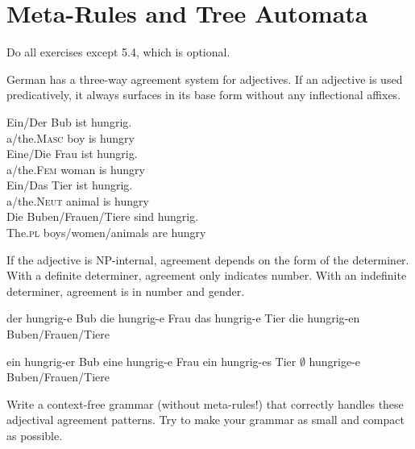 \chapter{Meta-Rules and Tree Automata}
\label{cha:metarules}

Do all exercises except 5.4, which is optional.

\begin{exercise}
    German has a three-way agreement system for adjectives.
    If an adjective is used predicatively, it always surfaces in its base form without any inflectional affixes.
    \begin{exe}
        \ex
        \begin{xlist}
            \ex \gll Ein\slash Der Bub ist hungrig.\\
                     a\slash the.\textsc{Masc} boy is hungry\\
            \ex \gll Eine\slash Die Frau ist hungrig.\\
                     a\slash the.\textsc{Fem} woman is hungry\\
            \ex \gll Ein\slash Das Tier ist hungrig.\\
                     a\slash the.\textsc{Neut} animal is hungry\\
            \ex \gll Die Buben\slash Frauen\slash Tiere sind hungrig.\\
                     The.\textsc{pl} boys\slash women\slash animals are hungry\\
        \end{xlist}
    \end{exe}
    If the adjective is NP-internal, agreement depends on the form of the determiner.
    With a definite determiner, agreement only indicates number.
    With an indefinite determiner, agreement is in number and gender.
    \begin{exe}
        \ex
        \begin{xlist}
            \ex der hungrig-e Bub
            \ex die hungrig-e Frau
            \ex das hungrig-e Tier
            \ex die hungrig-en Buben\slash Frauen\slash Tiere
        \end{xlist}
        \ex
        \begin{xlist}
            \ex ein hungrig-er Bub
            \ex eine hungrig-e Frau
            \ex ein hungrig-es Tier
            \ex $\emptyset$ hungrige-e Buben\slash Frauen\slash Tiere
        \end{xlist}
    \end{exe}
    Write a context-free grammar (without meta-rules!) that correctly handles these adjectival agreement patterns.
    Try to make your grammar as small and compact as possible.
\end{exercise}

